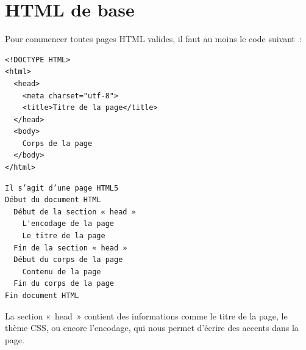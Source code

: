 \section{HTML de base}
Pour commencer toutes pages HTML valides, il faut au moins le code suivant :

\begin{minipage}{0.50\textwidth}
\begin{verbatim}
<!DOCTYPE HTML>
<html>
  <head>
    <meta charset="utf-8">
    <title>Titre de la page</title>
  </head>
  <body>
    Corps de la page
  </body>
</html>
\end{verbatim}
\end{minipage}
\begin{minipage}{0.50\textwidth}
\begin{verbatim}
Il s’agit d’une page HTML5
Début du document HTML
  Début de la section « head »
    L'encodage de la page
    Le titre de la page
  Fin de la section « head »
  Début du corps de la page
    Contenu de la page
  Fin du corps de la page
Fin document HTML
\end{verbatim}
\end{minipage}

La section « head » contient des informations comme le titre de la page, le
thème CSS, ou encore l'encodage, qui nous permet d'écrire des accents dans la
page.

